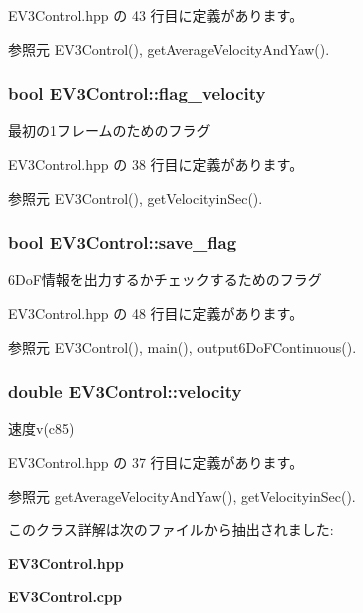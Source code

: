  E\-V3\-Control.\-hpp の 43 行目に定義があります。



参照元 E\-V3\-Control(), get\-Average\-Velocity\-And\-Yaw().

\subsubsection[{flag\-\_\-velocity}]{\setlength{\rightskip}{0pt plus 5cm}bool E\-V3\-Control\-::flag\-\_\-velocity}\label{class_e_v3_control_a353439722104f9c309920d0c0a1491de}


最初の1フレームのためのフラグ 



 E\-V3\-Control.\-hpp の 38 行目に定義があります。



参照元 E\-V3\-Control(), get\-Velocityin\-Sec().

\subsubsection[{save\-\_\-flag}]{\setlength{\rightskip}{0pt plus 5cm}bool E\-V3\-Control\-::save\-\_\-flag}\label{class_e_v3_control_abdd8dd38a39186e10013869fa4236605}


6\-Do\-F情報を出力するかチェックするためのフラグ 



 E\-V3\-Control.\-hpp の 48 行目に定義があります。



参照元 E\-V3\-Control(), main(), output6\-Do\-F\-Continuous().

\subsubsection[{velocity}]{\setlength{\rightskip}{0pt plus 5cm}double E\-V3\-Control\-::velocity}\label{class_e_v3_control_a3dbcb2b713381b2c050523b3a946af0a}


速度v(c85) 



 E\-V3\-Control.\-hpp の 37 行目に定義があります。



参照元 get\-Average\-Velocity\-And\-Yaw(), get\-Velocityin\-Sec().



このクラス詳解は次のファイルから抽出されました\-:\begin{DoxyCompactItemize}
\item 
{\bf E\-V3\-Control.\-hpp}\item 
{\bf E\-V3\-Control.\-cpp}\end{DoxyCompactItemize}

